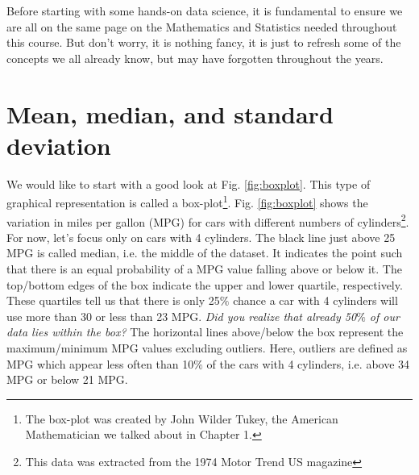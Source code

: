 Before starting with some hands-on data science, it is fundamental to ensure we are all on the same page on the Mathematics and Statistics needed throughout this course. But don't worry, it is nothing fancy, it is just to refresh some of the concepts we all already know, but may have forgotten throughout the years.

\section{Mean, median, and standard deviation}

We would like to start with a good look at Fig. \ref{fig:boxplot}. This type of graphical representation is called a box-plot\footnote{The box-plot was created by John Wilder Tukey, the American Mathematician we talked about in Chapter 1.}. Fig. \ref{fig:boxplot} shows the variation in miles per gallon (MPG) for cars with different numbers of cylinders\footnote{This data was extracted from the 1974 Motor Trend US magazine}. For now, let's focus only on cars with 4 cylinders. The black line just above 25 MPG is called median, i.e. the middle of the dataset. It indicates the point such that there is an equal probability of a MPG value falling above or below it. The top/bottom edges of the box indicate the upper and lower quartile, respectively. These quartiles tell us that there is only 25$\%$ chance a car with 4 cylinders will use more than 30 or less than 23 MPG. \textit{Did you realize that already 50$\%$ of our data lies within the box?} The horizontal lines above/below the box represent the maximum/minimum MPG values excluding outliers. Here, outliers are defined as MPG which appear less often than 10$\%$ of the cars with 4 cylinders, i.e. above 34 MPG or below 21 MPG.

